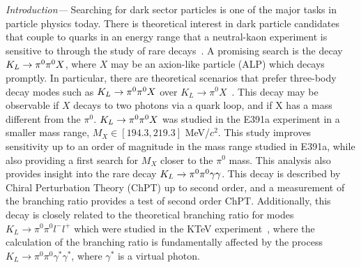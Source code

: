 \documentclass[twocolumn, superscriptaddress, aps,prl]{revtex4-2}
\begin{document}
\maketitle






\textit{Introduction---} Searching for dark sector particles is one of the major tasks in particle physics today. There is theoretical interest in dark particle candidates that couple to quarks in an energy range that a neutral-kaon experiment is sensitive to through the study of rare decays~\cite{qcd_scale_alp_coupling, dark_matter_quark_coupling, dark_matter_chiral, Bauer_2022}. A promising search is the decay $K_L \rightarrow \pi^0 \pi^0 X$, where $X$ may be an axion-like particle (ALP) which decays promptly. In particular, there are theoretical scenarios that prefer three-body decay modes such as $K_L \rightarrow \pi^0 \pi^0 X$ over $K_L\rightarrow\pi^0X$~\cite{flavourviolation_alp_balkin, balkin_pion_chimney}. This decay may be observable if $X$ decays to two photons via a quark loop, and if X has a mass different from the $\pi^0$. $K_L \rightarrow \pi^0 \pi^0 X$ was studied in the E391a experiment \cite{yuchen} in a smaller mass range, $M_X \in [194.3,219.3]$ MeV/$c^2$. This study improves sensitivity up to an order of magnitude in the mass range studied in E391a, while also providing a first search for $M_X$ closer to the $\pi^0$ mass. This analysis also provides insight into the rare decay $K_L \rightarrow \pi^0 \pi^0 \gamma \gamma$. This decay is described by Chiral Perturbation Theory (ChPT) \cite{funck_kambor} up to second order, and a measurement of the branching ratio provides a test of second order ChPT. Additionally, this decay is closely related to the theoretical branching ratio for modes $K_L\rightarrow\pi^0\pi^0l^-l^+$ which were studied in the KTeV experiment~\cite{2pi0ee_KTeV, 2pi0mumu_KTeV}, where the calculation of the branching ratio is fundamentally affected by the process $K_L\rightarrow\pi^0\pi^0\gamma^*\gamma^*$, where $\gamma^*$ is a virtual photon.
\end{document}
